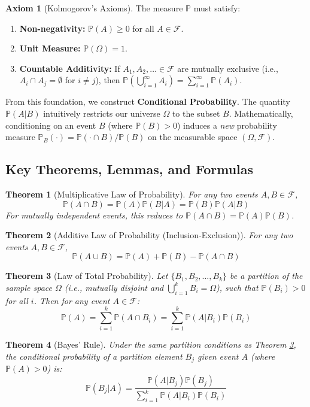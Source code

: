 \documentclass[12pt, a4paper]{article}
\newtheorem{theorem}{Theorem}[section]
\theoremstyle{definition}
\newtheorem{axiom}{Axiom}[section]
\theoremstyle{remark}
\newcommand{\Prob}{\mathbb{P}}
\newcommand{\F}{\mathcal{F}}
\newcommand{\W}{\Omega}
\newcommand{\1}{\mathbf{1}}
\begin{document}
\begin{axiom}[Kolmogorov's Axioms]
\label{ax:kolmogorov}
The measure $\Prob$ must satisfy:
\begin{enumerate}
    \item \textbf{Non-negativity:} $\Prob(A) \ge 0$ for all $A \in \F$.
    \item \textbf{Unit Measure:} $\Prob(\W) = 1$.
    \item \textbf{Countable Additivity:} If $A_1, A_2, \dots \in \F$ are mutually exclusive (i.e., $A_i \cap A_j = \emptyset$ for $i \neq j$), then $\Prob\left(\bigcup_{i=1}^\infty A_i\right) = \sum_{i=1}^\infty \Prob(A_i)$.
\end{enumerate}
\end{axiom}

From this foundation, we construct \textbf{Conditional Probability}. The quantity $\Prob(A|B)$ intuitively restricts our universe $\W$ to the subset $B$. Mathematically, conditioning on an event $B$ (where $\Prob(B) > 0$) induces a \textit{new} probability measure $\Prob_B(\cdot) = \Prob(\cdot \cap B) / \Prob(B)$ on the measurable space $(\W, \F)$.

\subsection{Key Theorems, Lemmas, and Formulas}
\begin{theorem}[Multiplicative Law of Probability]
For any two events $A, B \in \F$, 
\[ \Prob(A \cap B) = \Prob(A) \Prob(B|A) = \Prob(B) \Prob(A|B) \]
For mutually independent events, this reduces to $\Prob(A \cap B) = \Prob(A)\Prob(B)$.
\end{theorem}

\begin{theorem}[Additive Law of Probability (Inclusion-Exclusion)]
For any two events $A, B \in \F$,
\[ \Prob(A \cup B) = \Prob(A) + \Prob(B) - \Prob(A \cap B) \]
\end{theorem}

\begin{theorem}[Law of Total Probability]
\label{thm:ltp}
Let $\{B_1, B_2, \dots, B_k\}$ be a partition of the sample space $\W$ (i.e., mutually disjoint and $\bigcup_{i=1}^k B_i = \W$), such that $\Prob(B_i) > 0$ for all $i$. Then for any event $A \in \F$:
\[ \Prob(A) = \sum_{i=1}^k \Prob(A \cap B_i) = \sum_{i=1}^k \Prob(A | B_i)\Prob(B_i) \]
\end{theorem}

\begin{theorem}[Bayes' Rule]
Under the same partition conditions as Theorem \ref{thm:ltp}, the conditional probability of a partition element $B_j$ given event $A$ (where $\Prob(A) > 0$) is:
\[ \Prob(B_j | A) = \frac{\Prob(A | B_j)\Prob(B_j)}{\sum_{i=1}^k \Prob(A | B_i)\Prob(B_i)} \]
\end{theorem}
\end{document}
